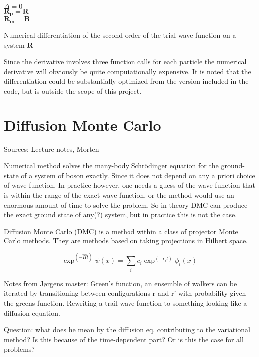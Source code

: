\begin{algorithm}
\BlankLine
$\Delta = 0$ \\
$\mathbf{R_p} = \mathbf{R}$\\
$\mathbf{R_m} = \mathbf{R}$\\
\BlankLine
{}
\BlankLine
\caption{Numerical differentiation of the second order of the trial wave function on a system $\mathbf{R}$}\label{alg:nd}
\end{algorithm} 

Since the derivative involves three function calls for each particle the numerical derivative will obviously be quite computationally expensive. It is noted  that the differentiation could be substantially optimized from the version included in the code, but is outside the scope of this project. 

\section{Diffusion Monte Carlo}

Sources: Lecture notes, Morten \cite{hjorthjensen}

Numerical method solves the many-body Schrödinger equation for the ground-state of a system of boson exactly. Since it does not depend on any a priori choice of wave function. In practice however, one needs a guess of the wave function that is within the range of the exact wave function, or the method would use an enormous amount of time to solve the problem. So in theory DMC can produce the exact ground state of any(?) system, but in practice this is not the case. 

Diffusion Monte Carlo (DMC) is a method within a class of projector Monte Carlo methods. They are methods based on taking projections in Hilbert space. 

\begin{equation}
\exp^{(-\hat{H}t)} \psi(x) = \sum_i c_i \exp^{(-\epsilon_i t)}\phi_i(x) 
\end{equation}

Notes from Jørgens master: Green's function, an ensemble of walkers can be iterated by transitioning between configurations r and r' with probability given the greens function. Rewriting a trail wave function to something looking like a diffusion equation.

Question: what does he mean by the diffusion eq. contributing to the variational method? Is this because of the time-dependent part? Or is this the case for all problems? 



